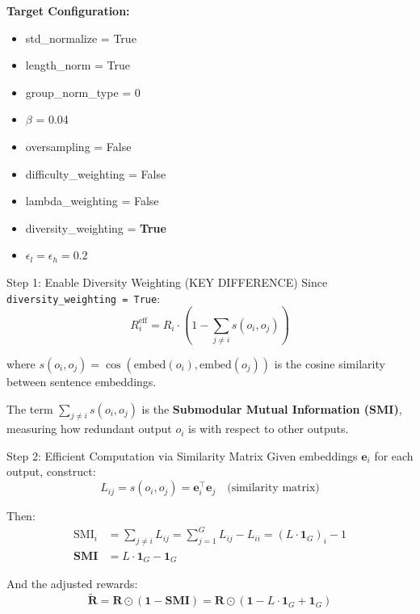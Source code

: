 \documentclass[11pt,a4paper]{article}
\begin{document}
\begin{configbox}
\textbf{Target Configuration:}
\begin{itemize}[noitemsep]
    \item std\_normalize = True
    \item length\_norm = True
    \item group\_norm\_type = 0
    \item $\beta$ = 0.04
    \item oversampling = False
    \item difficulty\_weighting = False
    \item lambda\_weighting = False
    \item diversity\_weighting = \textbf{True}
    \item $\epsilon_l = \epsilon_h = 0.2$
\end{itemize}
\end{configbox}

\begin{proofbox}{Step 1: Enable Diversity Weighting (KEY DIFFERENCE)}
Since \texttt{diversity\_weighting = True}:
\begin{equation}
R_i^{\text{eff}} = R_i \cdot \left(1 - \sum_{j \neq i} s(o_i, o_j)\right)
\end{equation}

where $s(o_i, o_j) = \cos(\text{embed}(o_i), \text{embed}(o_j))$ is the cosine similarity between sentence embeddings.

The term $\sum_{j \neq i} s(o_i, o_j)$ is the \textbf{Submodular Mutual Information (SMI)}, measuring how redundant output $o_i$ is with respect to other outputs.
\end{proofbox}

\begin{proofbox}{Step 2: Efficient Computation via Similarity Matrix}
Given embeddings $\mathbf{e}_i$ for each output, construct:
\begin{equation}
L_{ij} = s(o_i, o_j) = \mathbf{e}_i^\top \mathbf{e}_j \quad \text{(similarity matrix)}
\end{equation}

Then:
\begin{align}
\text{SMI}_i &= \sum_{j \neq i} L_{ij} = \sum_{j=1}^G L_{ij} - L_{ii} = (L \cdot \mathbf{1}_G)_i - 1 \\
\mathbf{SMI} &= L \cdot \mathbf{1}_G - \mathbf{1}_G
\end{align}

And the adjusted rewards:
\begin{equation}
\mathbf{\tilde{R}} = \mathbf{R} \odot (\mathbf{1} - \mathbf{SMI}) = \mathbf{R} \odot (\mathbf{1} - L \cdot \mathbf{1}_G + \mathbf{1}_G)
\end{equation}
\end{proofbox}
\end{document}
